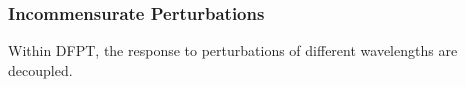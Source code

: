 \begin{frame}[allowframebreaks]
  \frametitle{Incommensurate Perturbations}

  Within DFPT, the response to perturbations of different wavelengths are decoupled.


\end{frame}

